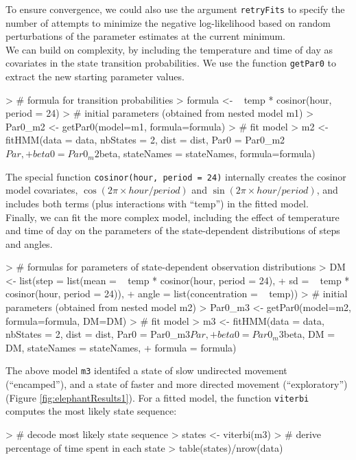 \documentclass[12pt]{article}
\begin{document}
To ensure convergence, we could also use the argument \verb|retryFits| to specify the number of attempts to minimize the negative log-likelihood based on random perturbations of the parameter estimates at the current minimum.\\

We can build on complexity, by including the temperature and time of day as covariates in the state transition probabilities. We use the function \verb|getPar0| to extract the new starting parameter values.
\begin{Schunk}
\begin{Sinput}
> # formula for transition probabilities
> formula <- ~ temp * cosinor(hour, period = 24)
> # initial parameters (obtained from nested model m1)
> Par0_m2 <- getPar0(model=m1, formula=formula)
> # fit model
> m2 <- fitHMM(data = data, nbStates = 2, dist = dist, Par0 = Par0_m2$Par, 
+              beta0=Par0_m2$beta, stateNames = stateNames, formula=formula)
\end{Sinput}
\end{Schunk}

The special function \verb|cosinor(hour, period = 24)| internally creates the cosinor model covariates, $\cos(2\pi \times hour / period)$ and $\sin(2\pi \times hour / period)$, and includes both terms (plus interactions with ``temp'') in the fitted model.\\

Finally, we can fit the more complex model, including the effect of temperature and time of day on the parameters of the state-dependent distributions of steps and angles.

\begin{Schunk}
\begin{Sinput}
> # formulas for parameters of state-dependent observation distributions
> DM <- list(step = list(mean = ~ temp * cosinor(hour, period = 24),
+                        sd = ~ temp * cosinor(hour, period = 24)),
+            angle = list(concentration = ~ temp))
> # initial parameters (obtained from nested model m2)
> Par0_m3 <- getPar0(model=m2, formula=formula, DM=DM)
> # fit model
> m3 <- fitHMM(data = data, nbStates = 2, dist = dist, Par0 = Par0_m3$Par, 
+              beta0 = Par0_m3$beta, DM = DM, stateNames = stateNames,
+              formula = formula)
\end{Sinput}
\end{Schunk}

The above model \verb|m3| identifed a state of slow undirected movement (``encamped''), and a state of faster and more directed movement (``exploratory'') (Figure \ref{fig:elephantResults1}). For a fitted model, the function \verb|viterbi| computes the most likely state sequence:
\begin{Schunk}
\begin{Sinput}
> # decode most likely state sequence
> states <- viterbi(m3)
> # derive percentage of time spent in each state
> table(states)/nrow(data)
\end{Sinput}
\end{Schunk}
\end{document}
